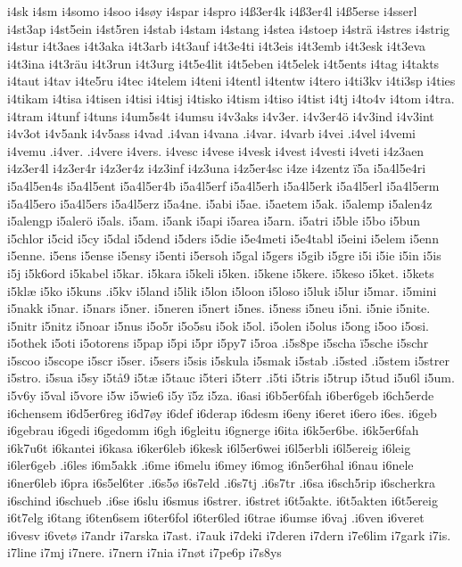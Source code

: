 {{i4sk
i4sm
i4somo
i4soo
i4søy
i4spar
i4spro
i4ß3er4k
i4ß3er4l
i4ß5erse
i4sserl
i4st3ap
i4st5ein
i4st5ren
i4stab
i4stam
i4stang
i4stea
i4stoep
i4strä
i4stres
i4strig
i4stur
i4t3aes
i4t3aka
i4t3arb
i4t3auf
i4t3e4ti
i4t3eis
i4t3emb
i4t3esk
i4t3eva
i4t3ina
i4t3räu
i4t3run
i4t3urg
i4t5e4lit
i4t5eben
i4t5elek
i4t5ents
i4tag
i4takts
i4taut
i4tav
i4te5ru
i4tec
i4telem
i4teni
i4tentl
i4tentw
i4tero
i4ti3kv
i4ti3sp
i4ties
i4tikam
i4tisa
i4tisen
i4tisi
i4tisj
i4tisko
i4tism
i4tiso
i4tist
i4tj
i4to4v
i4tom
i4tra.
i4tram
i4tunf
i4tuns
i4um5s4t
i4umsu
i4v3aks
i4v3er.
i4v3er4ö
i4v3ind
i4v3int
i4v3ot
i4v5ank
i4v5ass
i4vad
.i4van
i4vana
.i4var.
i4varb
i4vei
.i4vel
i4vemi
i4vemu
.i4ver.
.i4vere
i4vers.
i4vesc
i4vese
i4vesk
i4vest
i4vesti
i4veti
i4z3aen
i4z3er4l
i4z3er4r
i4z3er4z
i4z3inf
i4z3una
i4z5er4sc
i4ze
i4zentz
ï5a
i5a4l5e4ri
i5a4l5en4s
i5a4l5ent
i5a4l5er4b
i5a4l5erf
i5a4l5erh
i5a4l5erk
i5a4l5erl
i5a4l5erm
i5a4l5ero
i5a4l5ers
i5a4l5erz
i5a4ne.
i5abi
i5ae.
i5aetem
i5ak.
i5alemp
i5alen4z
i5alengp
i5alerö
i5als.
i5am.
i5ank
i5api
i5area
i5arn.
i5atri
i5ble
i5bo
i5bun
i5chlor
i5cid
i5cy
i5dal
i5dend
i5ders
i5die
i5e4meti
i5e4tabl
i5eini
i5elem
i5enn
i5enne.
i5ens
i5ense
i5ensy
i5enti
i5ersoh
i5gal
i5gers
i5gib
i5gre
i5i
i5ie
i5in
i5is
i5j
i5k6ord
i5kabel
i5kar.
i5kara
i5keli
i5ken.
i5kene
i5kere.
i5keso
i5ket.
i5kets
i5klæ
i5ko
i5kuns
.i5kv
i5land
i5lik
i5lon
i5loon
i5loso
i5luk
i5lur
i5mar.
i5mini
i5nakk
i5nar.
i5nars
i5ner.
i5neren
i5nert
i5nes.
i5ness
i5neu
i5ni.
i5nie
i5nite.
i5nitr
i5nitz
i5noar
i5nus
i5o5r
i5o5su
i5ok
i5ol.
i5olen
i5olus
i5ong
i5oo
i5osi.
i5othek
i5oti
i5otorens
i5pap
i5pi
i5pr
i5py7
i5roa
.i5s8pe
i5scha
ï5sche
i5schr
i5scoo
i5scope
i5scr
i5ser.
i5sers
i5sis
i5skula
i5smak
i5stab
.i5sted
.i5stem
i5strer
i5stro.
i5sua
i5sy
i5tå9
i5tæ
i5tauc
i5teri
i5terr
.i5ti
i5tris
i5trup
i5tud
i5u6l
i5um.
i5v6y
i5val
i5vore
i5w
i5wie6
i5y
ï5z
i5za.
i6asi
i6b5er6fah
i6ber6geb
i6ch5erde
i6chensem
i6d5er6reg
i6d7øy
i6def
i6derap
i6desm
i6eny
i6eret
i6ero
i6es.
i6geb
i6gebrau
i6gedi
i6gedomm
i6gh
i6gleitu
i6gnerge
i6ita
i6k5er6be.
i6k5er6fah
i6k7u6t
i6kantei
i6kasa
i6ker6leb
i6kesk
i6l5er6wei
i6l5erbli
i6l5ereig
i6leig
i6ler6geb
.i6les
i6m5akk
.i6me
i6melu
i6mey
i6mog
i6n5er6hal
i6nau
i6nele
i6ner6leb
i6pra
i6s5el6ter
.i6s5ø
i6s7eld
.i6s7tj
.i6s7tr
.i6sa
i6sch5rip
i6scherkra
i6schind
i6schueb
.i6se
i6slu
i6smus
i6strer.
i6stret
i6t5akte.
i6t5akten
i6t5ereig
i6t7elg
i6tang
i6ten6sem
i6ter6fol
i6ter6led
i6trae
i6umse
i6vaj
.i6ven
i6veret
i6vesv
i6vetø
i7andr
i7arska
i7ast.
i7auk
i7deki
i7deren
i7dern
i7e6lim
i7gark
i7is.
i7line
i7mj
i7nere.
i7nern
i7nia
i7nøt
i7pe6p
i7s8ys
}}
